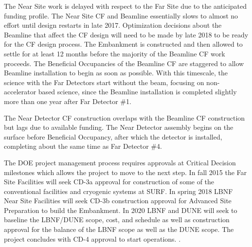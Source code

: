 The Near Site work is delayed with respect to the Far Site due to the anticipated funding profile. The Near Site CF and Beamline essentially slows to almost no effort until design restarts in late 2017. Optimization decisions about the Beamline that affect the CF design will need to be made by late 2018 to be ready for the CF design process. The Embankment is constructed and then allowed to settle for at least 12 months before the majority of the Beamline CF work proceeds. The Beneficial Occupancies of the Beamline CF are staggered to allow Beamline installation to begin as soon as possible. With this timescale, the science with the Far Detectors start without the beam, focusing on non-accelerator based science, since
the Beamline installation is completed slightly more than one year after Far Detector \#1. 

The Near Detector CF construction overlaps with the Beamline CF construction but lags due to available funding. The Near Detector assembly begins on the surface before Beneficial Occupancy, after which the detector is installed, completing about the same time as Far Detector \#4. 

The DOE project management process requires approvals at Critical Decision milestones which allows the project to move to the next step. In fall 2015 the Far Site Facilities will seek CD-3a approval for construction of some of the conventional facilities and cryogenic systems at SURF. In spring 2018 LBNF Near Site Facilities will seek CD-3b construction approval for Advanced Site Preparation to build the Embankment. In 2020 LBNF and DUNE will seek to baseline the LBNF/DUNE scope, cost, and schedule as well as construction approval for the balance of the LBNF scope as well as the DUNE scope. The project concludes with CD-4 approval to start operations.
. 
